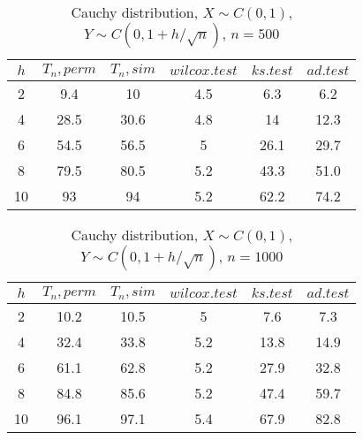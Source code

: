 \documentclass{svproc}
\begin{document}
\begin{table}
  \caption{Cauchy distribution, $X\sim C(0,1)$, $Y\sim C(0, 1 + h/\sqrt{n})$, $n=500$}
  \begin{center}
  \begin{tabular}{c@{\quad}c@{\quad}c@{\quad}c@{\quad}c@{\quad}c}
  \hline
  $h$ & $T_n, perm$ & $T_n, sim$ & $wilcox.test$ & $ks.test$ & $ad.test$ \\
  \hline
  2 & 9.4 & 10 & 4.5 & 6.3 & 6.2 \\
  4 & 28.5 & 30.6 & 4.8 & 14 & 12.3 \\
  6 & 54.5 & 56.5 & 5 & 26.1 & 29.7 \\
  8 & 79.5 & 80.5 & 5.2 & 43.3 & 51.0 \\
  10 & 93 & 94 & 5.2 & 62.2 & 74.2 \\
  \hline
  \end{tabular}
  \end{center}
\end{table}

\begin{table}
  \caption{Cauchy distribution, $X\sim C(0,1)$, $Y\sim C(0, 1 + h/\sqrt{n})$, $n=1000$}
  \begin{center}
  \begin{tabular}{c@{\quad}c@{\quad}c@{\quad}c@{\quad}c@{\quad}c}
  $h$ & $T_n, perm$ & $T_n, sim$ & $wilcox.test$ & $ks.test$ & $ad.test$ \\
  \hline
  2 & 10.2 & 10.5 & 5 & 7.6 & 7.3 \\
  4 & 32.4 & 33.8 & 5.2 & 13.8 & 14.9 \\
  6 & 61.1 & 62.8 & 5.2 & 27.9 & 32.8 \\
  8 & 84.8 & 85.6 & 5.2 & 47.4 & 59.7 \\
  10 & 96.1 & 97.1 & 5.4 & 67.9 & 82.8 \\
  \hline
  \end{tabular}
  \end{center}
\end{table}

\end{document}

